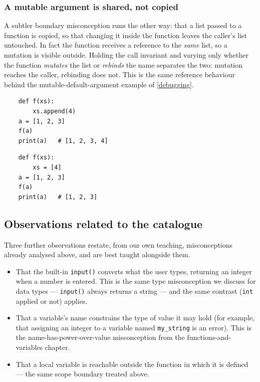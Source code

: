 \subsubsection{A mutable argument is shared, not copied}

A subtler boundary misconception runs the other way: that a list passed to a
function is copied, so that changing it inside the function leaves the caller's
list untouched. In fact the function receives a reference to the \emph{same}
list, so a mutation is visible outside. Holding the call invariant and varying
only whether the function \emph{mutates} the list or \emph{rebinds} the name
separates the two: mutation reaches the caller, rebinding does not. This is the
same reference behaviour behind the mutable-default-argument example of
\cref{debugging}.

\hfill
\begin{minipage}[t]{0.45\columnwidth}
  \begin{verbatim}
    def f(xs):
        xs.append(4)
    a = [1, 2, 3]
    f(a)
    print(a)   # [1, 2, 3, 4]
  \end{verbatim}
\end{minipage}
\hfill
\begin{minipage}[t]{0.45\columnwidth}
  \begin{verbatim}
    def f(xs):
        xs = [4]
    a = [1, 2, 3]
    f(a)
    print(a)   # [1, 2, 3]
  \end{verbatim}
\end{minipage}

\subsection{Observations related to the catalogue}

Three further observations restate, from our own teaching, misconceptions
already analysed above, and are best taught alongside them.

\begin{itemize}
  \item That the built-in \texttt{input()} converts what the user
    types, returning an integer when a number is entered. This is the same
    type misconception we discuss for data types --- \texttt{input()}
    always returns a string --- and the same contrast (\texttt{int}
    applied or not) applies.
  \item That a variable's name constrains the type of value it may hold (for
    example, that assigning an integer to a variable named
    \texttt{my_string} is an error). This is the
    name-has-power-over-value misconception from the functions-and-variables
    chapter.
  \item That a local variable is reachable outside the function in which it is
    defined --- the same scope boundary treated above.
\end{itemize}

